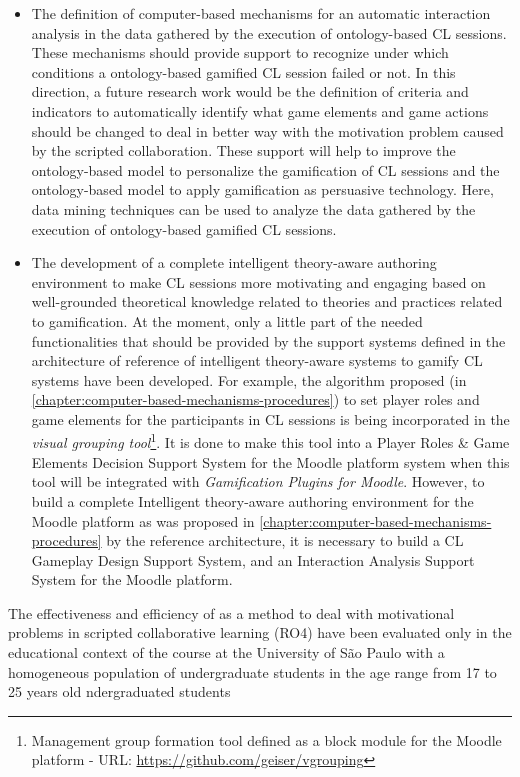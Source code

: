 \begin{itemize}
\item The definition of computer-based mechanisms for an automatic interaction analysis in the data gathered by the execution of ontology-based CL sessions. These mechanisms should provide support to recognize under which conditions a ontology-based gamified CL session failed or not. In this direction, a future research work would be the definition of criteria and indicators to automatically identify what game elements and game actions should be changed to deal in better way with the motivation problem caused by the scripted collaboration. These support will help to improve the ontology-based model to personalize the gamification of CL sessions and the ontology-based model to apply gamification as persuasive technology. Here, data mining techniques can be used to analyze the data gathered by the execution of ontology-based gamified CL sessions.

\item The development of a complete intelligent theory-aware authoring environment to make CL sessions more motivating and engaging based on well-grounded theoretical knowledge related to theories and practices related to gamification. At the moment, only a little part of the needed functionalities that should be provided by the support systems defined in the architecture of reference of intelligent theory-aware systems to gamify CL systems have been developed. For example, the algorithm proposed (in \autoref{chapter:computer-based-mechanisms-procedures}) to set player roles and game elements for the participants in CL sessions is being incorporated in the \emph{visual grouping tool}\footnote{Management group formation tool defined as a block module for the Moodle platform - URL: \url{https://github.com/geiser/vgrouping}}. It is done to make this tool into a Player Roles \& Game Elements Decision Support System for the Moodle platform system when this tool will be integrated with \emph{Gamification Plugins for Moodle}. However, to build a complete Intelligent theory-aware authoring environment for the Moodle platform as was proposed in \autoref{chapter:computer-based-mechanisms-procedures} by the reference architecture, it is necessary to build a CL Gameplay Design Support System, and an Interaction Analysis Support System for the Moodle platform.
\end{itemize}

The effectiveness and efficiency of  as a method to deal with motivational problems in scripted collaborative learning (RO4) have been evaluated only in the educational context of the course  at the University of São Paulo with a homogeneous population of undergraduate students in the age range from 17 to 25 years old
ndergraduated students 

